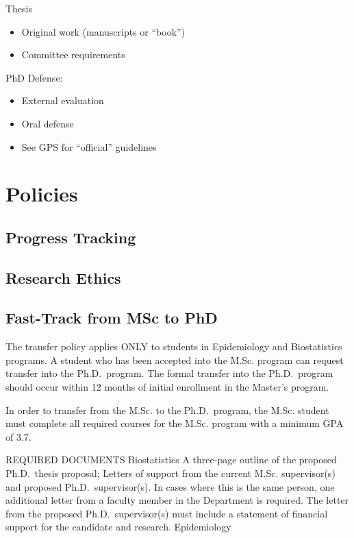 \documentclass[
]{book}
\providecommand{\tightlist}{%
  \setlength{\itemsep}{0pt}\setlength{\parskip}{0pt}}
\begin{document}
Thesis

\begin{itemize}
\tightlist
\item
  Original work (manuscripts or ``book'')
\item
  Committee requirements
\end{itemize}

PhD Defense:

\begin{itemize}
\tightlist
\item
  External evaluation
\item
  Oral defense
\item
  See GPS for ``official'' guidelines
\end{itemize}

\hypertarget{policies}{%
\chapter{Policies}\label{policies}}

\hypertarget{progress-tracking}{%
\section{Progress Tracking}\label{progress-tracking}}

\hypertarget{research-ethics}{%
\section{Research Ethics}\label{research-ethics}}

\hypertarget{fast-track-from-msc-to-phd}{%
\section{Fast-Track from MSc to PhD}\label{fast-track-from-msc-to-phd}}

The transfer policy applies ONLY to students in Epidemiology and Biostatistics programs. A student who has been accepted into the M.Sc. program can request transfer into the Ph.D.~program. The formal transfer into the Ph.D.~program should occur within 12 months of initial enrollment in the Master's program.

In order to transfer from the M.Sc. to the Ph.D.~program, the M.Sc. student must complete all required courses for the M.Sc. program with a minimum GPA of 3.7.

REQUIRED DOCUMENTS
Biostatistics
A three-page outline of the proposed Ph.D.~thesis proposal;
Letters of support from the current M.Sc. supervisor(s) and proposed Ph.D.~supervisor(s). In cases where this is the same person, one additional letter from a faculty member in the Department is required. The letter from the proposed Ph.D.~supervisor(s) must include a statement of financial support for the candidate and research.
Epidemiology
\end{document}
